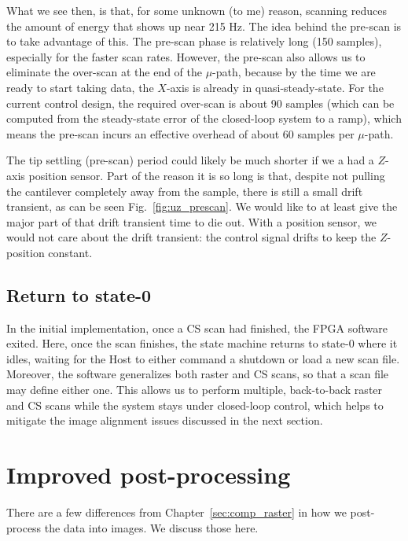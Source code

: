 What we see then, is that, for some unknown (to me) reason, scanning reduces the amount of energy that shows up near 215 Hz. The idea behind the pre-scan is to take advantage of this.
The pre-scan phase is relatively long (150 samples), especially for the faster scan rates.
However, the pre-scan also allows us to eliminate the over-scan at the end of the $\mu$-path, because by the time we are ready to start taking data, the $X$-axis is already in quasi-steady-state. For the current control design, the required over-scan is about 90 samples (which can be computed from the steady-state error of the closed-loop system to a ramp), which means the pre-scan incurs an effective overhead of about 60 samples per $\mu$-path.

The tip settling (pre-scan) period could likely be much shorter if we a had a $Z$-axis position sensor. Part of the reason it is so long is that, despite not pulling the cantilever completely away from the sample, there is still a small drift transient, as can be seen Fig.~\ref{fig:uz_prescan}. We would like to at least give the major part of that drift transient time to die out.
With a position sensor, we would not care about the drift transient: the control signal drifts to keep the $Z$-position constant.

\subsection{Return to state-0}\label{sec:idle_0}
In the initial implementation, once a CS scan had finished, the FPGA software exited. Here, once the scan finishes, the state machine returns to state-0 where it idles, waiting for the Host to either command a shutdown or load a new scan file. Moreover, the software generalizes both raster and CS scans, so that a scan file may define either one. This allows us to perform multiple, back-to-back raster and CS scans while the system stays under closed-loop control, which helps to mitigate the image alignment issues discussed in the next section.


\section{Improved post-processing}\label{sec:post_process}
There are a few differences from Chapter~\ref{sec:comp_raster} in how we post-process the data into images. We discuss those here. 
